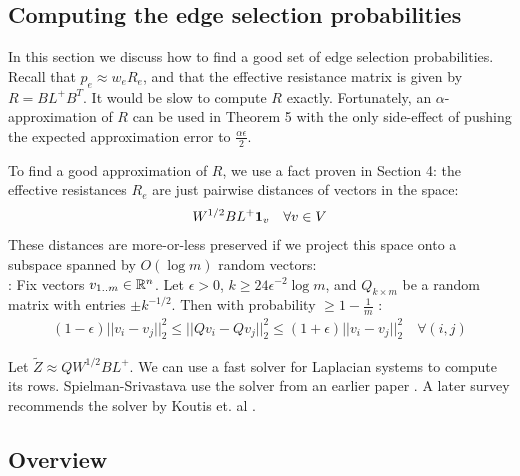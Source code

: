 \documentclass{article}
\begin{document}
\subsection{Computing the edge selection probabilities}

In this section we discuss how to find a good set of edge selection
probabilities. Recall that $p_e \approx w_eR_e$, and that the effective
resistance matrix is given by $R = BL^+B^T$. It would be slow to compute $R$
exactly.  Fortunately, an $\alpha$-approximation of $R$ can be used in
Theorem 5 with the only side-effect of pushing the expected approximation
error to $\frac{\alpha\epsilon}{2}$.

To find a good approximation of $R$, we use a fact proven in Section 4: the
effective resistances $R_e$ are just pairwise distances of vectors in the
space: \begin{align*}
    W^{1/2}BL^+\mathbf{1}_v \quad \forall{v \in V}
\end{align*}
These distances are more-or-less preserved if we project this space onto a
subspace spanned by $O(\log m)$ random vectors: \\

\noindent
{}: Fix vectors $v_{1..m} \in
\mathbb{R}^n$. Let $\epsilon > 0$, $k \geq 24\epsilon^{-2}\log m$, and $Q_{k \times
m}$ be a random matrix with entries $\pm k^{-1/2}$. Then with probability
$\geq 1 - \frac{1}{m}$ \cite{SpielmanSrivastava} \cite{Achlioptas}:
\begin{align*}
    (1-\epsilon)||v_i-v_j||^2_2 \leq ||Qv_i-Qv_j||^2_2 \leq
    (1+\epsilon)||v_i-v_j||^2_2 \quad \forall{(i,j)}
\end{align*}

Let $\tilde{Z} \approx QW^{1/2}BL^+$. We can use a fast solver for Laplacian
systems to compute its rows. Spielman-Srivastava use the solver from an
earlier paper \cite{SpielmanTeng}. A later survey recommends the solver by
Koutis et. al \cite{TheSurvey} \cite{FastLaplacianSolver}.

\subsection{Overview}
\end{document}
